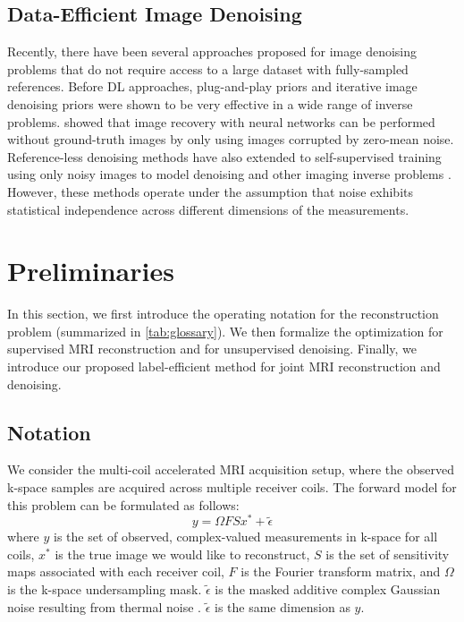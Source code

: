 \documentclass[10pt,twocolumn,letterpaper]{article}
\newcommand{\RV}[1]{{#1}}
\begin{document}
\subsection{Data-Efficient Image Denoising}
Recently, there have been several approaches proposed for image denoising problems that do not require access to a large dataset with fully-sampled references. Before DL approaches, plug-and-play priors \cite{pnp} and iterative image denoising priors \cite{romano2017little} were shown to be very effective in a wide range of inverse problems. \cite{lehtinen2018noise2noise} showed that image recovery with neural networks can be performed without ground-truth images by only using images corrupted by zero-mean noise. Reference-less denoising methods have also extended to self-supervised training using only noisy images to model denoising \cite{batson2019noise2self,hu2021system} and other imaging inverse problems \cite{hendriksen2020noise2inverse}. However, these methods operate under the assumption that noise exhibits statistical independence across different dimensions of the measurements.

\section{Preliminaries}
In this section, we first introduce the operating notation for the reconstruction problem (summarized in \cref{tab:glossary}). We then formalize the optimization for supervised MRI reconstruction and for unsupervised denoising. Finally, we introduce our proposed label-efficient method for joint MRI reconstruction and denoising.

\subsection{Notation}
We consider the multi-coil accelerated MRI acquisition setup, where the observed k-space samples are acquired across multiple receiver coils. The forward model for this problem can be formulated as follows:
\begin{equation}
    \RV{y = \Omega FSx^* + \tilde{\epsilon}}
\end{equation}
where $y$ is the set of observed, complex-valued measurements in k-space for all coils, $x^*$ is the true image we would like to reconstruct, $S$ is the set of sensitivity maps associated with each receiver coil, $F$ is the Fourier transform matrix, and $\Omega$ is the k-space undersampling mask. \RV{$\tilde{\epsilon}$} is the masked additive complex Gaussian noise resulting from thermal noise \cite{macovski1996noise}. $\tilde{\epsilon}$ is the same dimension as $y$.
\end{document}
